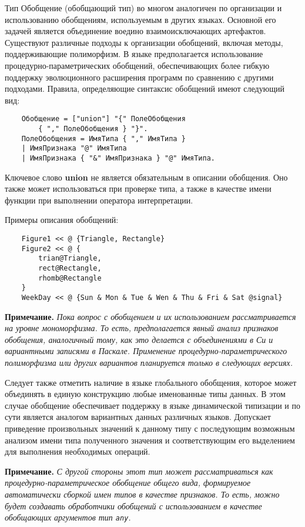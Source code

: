 {Тип Обобщение (обобщающий тип) во многом аналогичен по организации и использованию обобщениям, используемым в других языках. Основной его задачей является объединение воедино взаимоисключающих артефактов. Существуют различные подходы к организации обобщений, включая методы, поддерживающие полиморфизм. В языке предполагается использование процедурно-параметрических обобщений, обеспечивающих более гибкую поддержку эволюционного расширения программ по сравнению с другими подходами. Правила, определяющие синтаксис обобщений имеют следующий вид:

\begin{verbatim}
    Обобщение = ["union"] "{" ПолеОбобщения
        { "," ПолеОбобщения } "}".
    ПолеОбобщения = ИмяТипа { "," ИмяТипа }
    | ИмяПризнака "@" ИмяТипа
    | ИмяПризнака { "&" ИмяПризнака } "@" ИмяТипа.
\end{verbatim}


Ключевое слово \textbf{union} не является обязательным в описании обобщения. Оно также может использоваться при проверке типа, а также в качестве имени функции при выполнении оператора интерпретации.

Примеры описания обобщений:

\begin{verbatim}
    Figure1 << @ {Triangle, Rectangle}
    Figure2 << @ {
        trian@Triangle,
        rect@Rectangle,
        rhomb@Rectangle
    }
    WeekDay << @ {Sun & Mon & Tue & Wen & Thu & Fri & Sat @signal}
\end{verbatim}

\textbf{Примечание.}
\textit{Пока вопрос с обобщением и их использованием рассматривается на уровне мономорфизма. То есть, предполагается явный анализ признаков обобщения, аналогичный тому, как это делается с объединениями в Си и вариантными записями в Паскале. Применение процедурно-параметрического полиморфизма или других вариантов планируется только в следующих версиях.}

Следует также отметить наличие в языке глобального обобщения, которое может объединять в единую конструкцию любые именованные типы данных. В этом случае обобщение обеспечивает поддержку в языке динамической типизации и по сути является аналогом вариантных данных различных языков. Допускает приведение произвольных значений к данному типу с последующим возможным анализом имени типа полученного значения и соответствующим его выделением для выполнения необходимых операций.

\textbf{Примечание.}
\textit{С другой стороны этот тип может рассматриваться как процедурно-параметрическое обобщение общего вида, формируемое автоматически сборкой имен типов в качестве признаков. То есть, можно будет создавать обработчики обобщений с использованием в качестве обобщающих аргументов тип \texttt{any}.}

}
